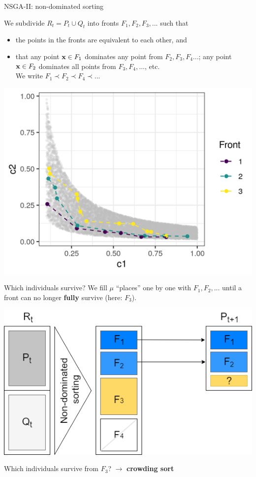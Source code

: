 \begin{frame}[allowframebreaks]{NSGA-II: non-dominated sorting}



\begin{footnotesize}
We subdivide $R_t = P_t \cup Q_t$ into fronts $F_1, F_2, F_3, ...$ such that

\begin{itemize}
\item the points in the fronts are equivalent to each other, and
\item that any point $\mathbf{x} \in F_1$ dominates any point from $F_2, F_3, F_4...$; any point $\mathbf{x} \in F_2$ dominates all points from $F_3, F_4, ...$, etc. \\
We write $F_1 \prec F_2 \prec F_4 \prec ... $
\end{itemize}
\end{footnotesize}

\begin{center}
\includegraphics[width = 0.5\linewidth]{images/NSGA2_NDS.png}
\end{center}

\framebreak

Which individuals survive? We fill $\mu$ \enquote{places} one by one with $F_1, F_2, ...$ until a front can no longer \textbf{fully} survive (here: $F_3$).

\begin{center}
\includegraphics[width = 0.45\linewidth]{images/NSGA2_2.png}
\end{center}

Which individuals survive from $F_3$? $\to$ \textbf{crowding sort}

\end{frame}

